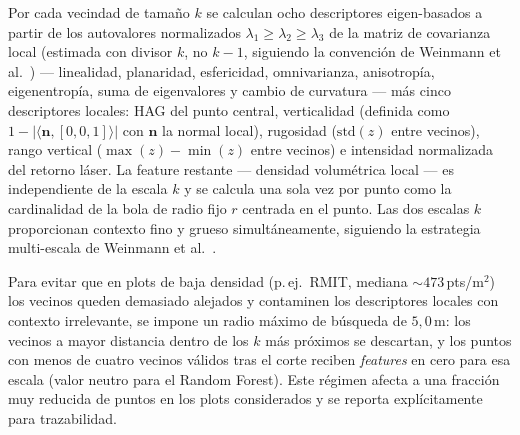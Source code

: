 \documentclass[runningheads]{llncs}
\begin{document}
Por cada vecindad de tama\~no $k$ se calculan ocho descriptores eigen-basados a partir de los autovalores normalizados $\lambda_1 \geq \lambda_2 \geq \lambda_3$ de la matriz de covarianza local (estimada con divisor $k$, no $k-1$, siguiendo la convenci\'on de Weinmann et al.~\cite{weinmann2015}) --- linealidad, planaridad, esfericidad, omnivarianza, anisotrop\'ia, eigenentrop\'ia, suma de eigenvalores y cambio de curvatura --- m\'as cinco descriptores locales: HAG del punto central, verticalidad (definida como $1 - |\langle \mathbf{n}, [0,0,1]\rangle|$ con $\mathbf{n}$ la normal local), rugosidad ($\text{std}(z)$ entre vecinos), rango vertical ($\max(z)-\min(z)$ entre vecinos) e intensidad normalizada del retorno l\'aser. La feature restante --- densidad volum\'etrica local --- es independiente de la escala $k$ y se calcula una sola vez por punto como la cardinalidad de la bola de radio fijo $r$ centrada en el punto. Las dos escalas $k$ proporcionan contexto fino y grueso simult\'aneamente, siguiendo la estrategia multi-escala de Weinmann et al.~\cite{weinmann2015}.

Para evitar que en plots de baja densidad (p.\,ej.\ RMIT, mediana $\sim\!473$\,pts/m$^2$) los vecinos queden demasiado alejados y contaminen los descriptores locales con contexto irrelevante, se impone un radio m\'aximo de b\'usqueda de $5{,}0$\,m: los vecinos a mayor distancia dentro de los $k$ m\'as pr\'oximos se descartan, y los puntos con menos de cuatro vecinos v\'alidos tras el corte reciben \emph{features} en cero para esa escala (valor neutro para el Random Forest). Este r\'egimen afecta a una fracci\'on muy reducida de puntos en los plots considerados y se reporta expl\'icitamente para trazabilidad.
\end{document}
